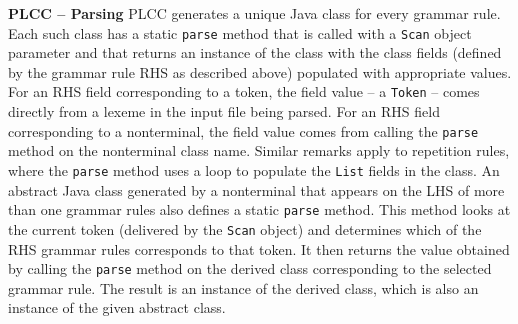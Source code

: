 \begin{minipage}[t]{\sw}
\slidenumber
\LARGE
{\bf PLCC -- Parsing}\exx
PLCC generates a unique Java class for every grammar rule.
Each such class has a static \verb'parse' method
that is called with a \verb'Scan' object parameter
and that returns an instance of the class
with the class fields (defined by the grammar rule RHS as described above)
populated with appropriate values.
For an RHS field corresponding to a token,
the field value -- a \verb'Token' -- comes directly
from a lexeme in the input file being parsed.
For an RHS field corresponding to a nonterminal,
the field value comes from calling the \verb'parse' method
on the nonterminal class name.\exx
Similar remarks apply to repetition rules,
where the \verb'parse' method uses a loop
to populate the \verb'List' fields in the class.\exx
An abstract Java class generated by a nonterminal
that appears on the LHS of more than one grammar rules
also defines a static \verb'parse' method.
This method looks at the current token (delivered by the \verb'Scan' object)
and determines which of the RHS grammar rules corresponds to that token.
It then returns the value obtained
by calling the \verb'parse' method on the derived class
corresponding to the selected grammar rule.
The result is an instance of the derived class,
which is also an instance of the given abstract class.

\end{minipage}
\clearpage
